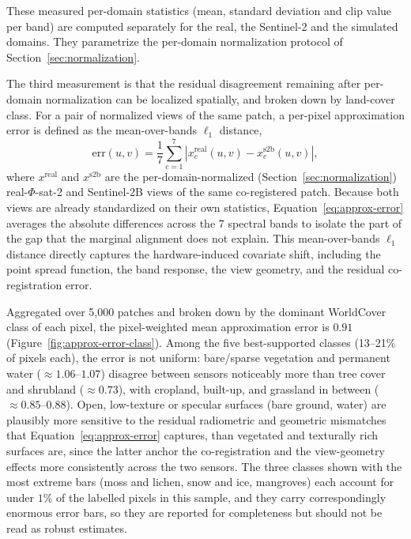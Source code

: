 These measured per-domain statistics (mean, standard deviation and clip value per band) are computed separately for the real, the Sentinel-2 and the simulated domains.
They parametrize the per-domain normalization protocol of Section~\ref{sec:normalization}.

\vspace{5mm}

The third measurement is that the residual disagreement remaining after per-domain normalization can be localized spatially, and broken down by land-cover class.
For a pair of normalized views of the same patch, a per-pixel approximation error is defined as the mean-over-bands $\ell_1$ distance,
\begin{equation}
    \mathrm{err}(u,v) = \frac{1}{7}\sum_{c=1}^{7} \left| x^{\text{real}}_{c}(u,v) - x^{\text{s2b}}_{c}(u,v) \right|,
    \label{eq:approx-error}
\end{equation}
where $x^{\text{real}}$ and $x^{\text{s2b}}$ are the per-domain-normalized (Section~\ref{sec:normalization}) real-$\Phi$-sat-2 and Sentinel-2B views of the same co-registered patch.
Because both views are already standardized on their own statistics, Equation~\eqref{eq:approx-error} averages the absolute differences across the 7 spectral bands to isolate the part of the gap that the marginal alignment does not explain.
This mean-over-bands $\ell_1$ distance directly captures the hardware-induced covariate shift, including the point spread function, the band response, the view geometry, and the residual co-registration error.

Aggregated over 5,000 patches and broken down by the dominant  WorldCover class of each pixel, the pixel-weighted mean approximation error is $0.91$ (Figure~\ref{fig:approx-error-class}).
Among the five best-supported classes (13--21\% of pixels each), the error is not uniform: bare/sparse vegetation and permanent water ($\approx 1.06$--$1.07$) disagree between sensors noticeably more than tree cover and shrubland ($\approx 0.73$), with cropland, built-up, and grassland in between ($\approx 0.85$--$0.88$).
Open, low-texture or specular surfaces (bare ground, water) are plausibly more sensitive to the residual radiometric and geometric mismatches that Equation~\eqref{eq:approx-error} captures, than vegetated and texturally rich surfaces are, since the latter anchor the co-registration and the view-geometry effects more consistently across the two sensors.
The three classes shown with the most extreme bars (moss and lichen, snow and ice, mangroves) each account for under $1\%$ of the labelled pixels in this sample, and they carry correspondingly enormous error bars, so they are reported for completeness but should not be read as robust estimates.

